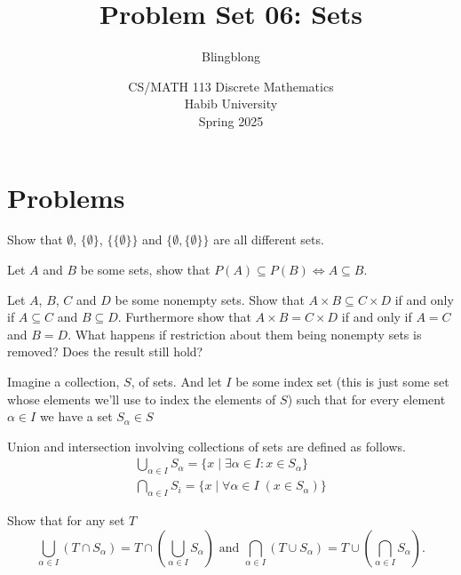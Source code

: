\documentclass[a4paper]{exam}
\title{Problem Set 06: Sets}
\author{Blingblong} %
\date{CS/MATH 113 Discrete Mathematics\\Habib University\\Spring 2025}
\begin{document}
\maketitle      


\section*{Problems}
\begin{questions}
    \question Show that $\emptyset$, $\{\emptyset\}$, $\{\{\emptyset\}\}$ and $\{\emptyset, \{\emptyset\}\}$ are all different sets.
    \begin{solution}
    \end{solution}

    \question Let $A$ and $B$ be some sets, show that $P(A) \subseteq P(B) \iff A \subseteq B$.
    \begin{solution}
    \end{solution}

    \question Let $A$, $B$, $C$ and $D$ be some nonempty sets. Show that $A \times B \subseteq C \times D$ if and only if $A \subseteq C$ and $B \subseteq D$.  Furthermore show that $A \times B = C \times D$ if and only if $A = C$ and $B = D$. What happens if restriction about them being nonempty sets is removed? Does the result still hold?
    \begin{solution}
    \end{solution}

    \question Imagine a collection, $S$, of sets. And let $I$ be some index set (this is just some set whose elements we'll use to index the elements of $S$) such that for every element $\alpha \in I$ we have a set $S_\alpha\in S$ 
     
    Union and intersection involving collections of sets are defined as follows.
    \begin{align*}
    \bigcup_{\alpha \in I}S_\alpha = \{x\mid \exists \alpha \in I : x \in S_\alpha\}\\
    \bigcap_{\alpha \in I}S_i = \{x\mid\forall \alpha \in I\; (x \in S_\alpha)\}
    \end{align*}

Show that for any set $T$
    \[
      \bigcup_{\alpha \in I}(T \cap S_\alpha) = T \cap \left(\bigcup_{\alpha\in I}S_\alpha  \right)
      \text{ and }
      \bigcap_{\alpha\in I}(T \cup S_\alpha) = T \cup \left(\bigcap_{\alpha\in I}S_\alpha  \right).
    \]
    
    \begin{solution}
    \end{solution}



\end{questions}
\end{document}
